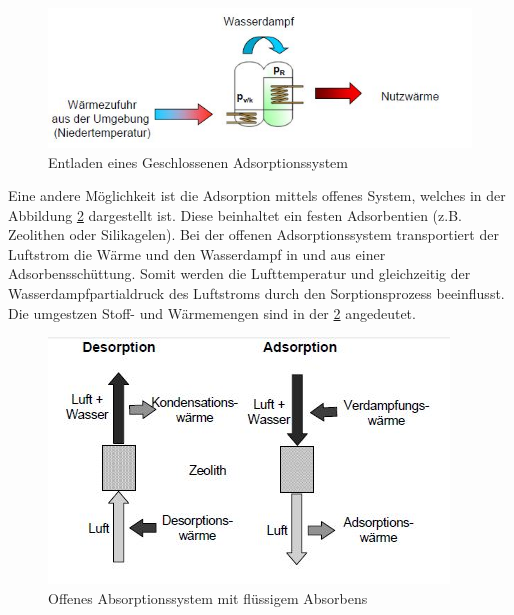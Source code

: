 \documentclass[11pt,a4paper]{scrartcl}
\begin{document}
\begin{figure}[h!]
\begin{center}
\includegraphics[scale=0.6]{images/geschlossenerentladen.jpg}
\caption{Entladen eines Geschlossenen Adsorptionssystem \cite{zeosys}}
\label{fig:geschlossenerentladen}
\end{center}
\end{figure}


Eine andere Möglichkeit ist die Adsorption mittels offenes System, welches in
der Abbildung \ref{fig:offenessystemadsorption} dargestellt ist. Diese
beinhaltet ein festen Adsorbentien (z.B. Zeolithen oder Silikagelen).  Bei der
offenen Adsorptionssystem transportiert der Luftstrom die Wärme und den
Wasserdampf in und aus einer Adsorbensschüttung. Somit werden die Lufttemperatur
und gleichzeitig der Wasserdampfpartialdruck des Luftstroms durch den
Sorptionsprozess beeinflusst. Die umgestzen Stoff- und Wärmemengen sind in der
\ref{fig:offenessystemadsorption} angedeutet.


\begin{figure}[h!]
\begin{center}
\includegraphics[scale=1]{images/offenessystemadsorption.jpg}
\caption{Offenes Absorptionssystem mit flüssigem Absorbens}
\label{fig:offenessystemadsorption}
\end{center}
\end{figure}
\end{document}

